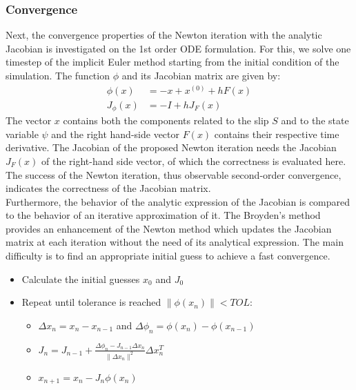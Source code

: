 \subsubsection{Convergence}
Next, the convergence properties of the Newton iteration with the analytic Jacobian is investigated on the 1st order ODE formulation. For this, we solve one timestep of the implicit Euler method starting from the initial condition of the simulation. The function $\phi$ and its Jacobian matrix are given by: 
\begin{align}
\phi(x) &= -x + x^{(0)} + h F(x) \\
J_\phi(x) &= -I + h J_F(x)
\end{align}
The vector $x$ contains both the components related to the slip $S$ and to the state variable $\psi$ and the right hand-side vector $F(x)$ contains their respective time derivative. The Jacobian of the proposed Newton iteration needs the Jacobian $J_F(x)$ of the right-hand side vector, of which the correctness is evaluated here. The success of the Newton iteration, thus observable second-order convergence, indicates the correctness of the Jacobian matrix. \\
Furthermore, the behavior of the analytic expression of the Jacobian is compared to the behavior of an iterative approximation of it. The Broyden's method \cite{BroydenIteration} provides an enhancement of the Newton method which updates the Jacobian matrix at each iteration without the need of its analytical expression. The main difficulty is to find an appropriate initial guess to achieve a fast convergence. 

\begin{itemize}
	\item Calculate the initial guesses $x_0$ and $J_0$
	\item Repeat until tolerance is reached $\|\phi(x_n)\| < TOL$: 
	\begin{itemize}
		\item $\Delta x_n = x_n - x_{n-1}$ and $\Delta \phi_n = \phi(x_n) - \phi(x_{n-1})$ 
		\item $J_n = J_{n-1} + \frac{\Delta \phi_n - J_{n-1}\Delta x_n}{\|\Delta x_n\|^2} \Delta x_n^T$
		\item $x_{n+1} = x_n - J_n \phi(x_n)$
	\end{itemize} 
\end{itemize}

